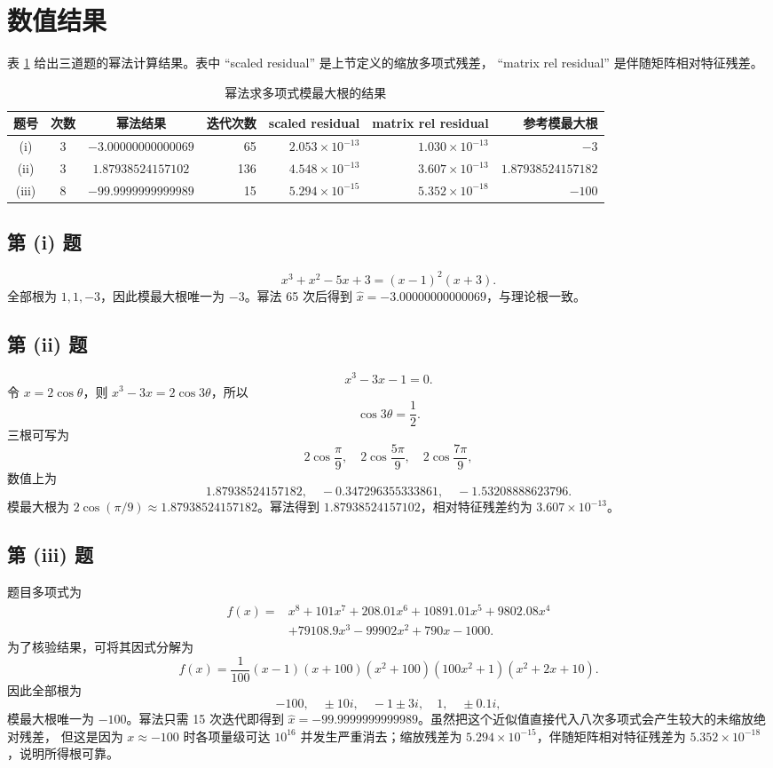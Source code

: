 \documentclass[a4paper,11pt]{article}
\begin{document}
\section{数值结果}
表 \ref{tab:results} 给出三道题的幂法计算结果。表中 ``scaled residual'' 是上节定义的缩放多项式残差，
``matrix rel residual'' 是伴随矩阵相对特征残差。

\begin{table}[H]
\centering
\scriptsize
\caption{幂法求多项式模最大根的结果}
\label{tab:results}
\setlength{\tabcolsep}{3pt}
\begin{tabular}{cccrrrr}
\toprule
题号 & 次数 & 幂法结果 & 迭代次数 & scaled residual & matrix rel residual & 参考模最大根 \\
\midrule
(i) & 3 & $-3.00000000000069$ & 65  & $2.053\times10^{-13}$ & $1.030\times10^{-13}$ & $-3$ \\
(ii) & 3 & $1.87938524157102$ & 136 & $4.548\times10^{-13}$ & $3.607\times10^{-13}$ & $1.87938524157182$ \\
(iii) & 8 & $-99.9999999999989$ & 15 & $5.294\times10^{-15}$ & $5.352\times10^{-18}$ & $-100$ \\
\bottomrule
\end{tabular}
\end{table}

\subsection{第 (i) 题}
\[
    x^3+x^2-5x+3=(x-1)^2(x+3).
\]
全部根为 $1,1,-3$，因此模最大根唯一为 $-3$。幂法 65 次后得到
$\hat x=-3.00000000000069$，与理论根一致。

\subsection{第 (ii) 题}
\[
    x^3-3x-1=0.
\]
令 $x=2\cos\theta$，则 $x^3-3x=2\cos3\theta$，所以
\[
    \cos3\theta=\frac12.
\]
三根可写为
\[
    2\cos\frac{\pi}{9},\quad
    2\cos\frac{5\pi}{9},\quad
    2\cos\frac{7\pi}{9},
\]
数值上为
\[
    1.87938524157182,\quad -0.347296355333861,\quad -1.53208888623796.
\]
模最大根为 $2\cos(\pi/9)\approx1.87938524157182$。幂法得到
$1.87938524157102$，相对特征残差约为 $3.607\times10^{-13}$。

\subsection{第 (iii) 题}
题目多项式为
\[
\begin{aligned}
f(x)=&x^8+101x^7+208.01x^6+10891.01x^5+9802.08x^4\\
&+79108.9x^3-99902x^2+790x-1000 .
\end{aligned}
\]
为了核验结果，可将其因式分解为
\[
    f(x)=\frac{1}{100}(x-1)(x+100)(x^2+100)(100x^2+1)(x^2+2x+10).
\]
因此全部根为
\[
    -100,\quad \pm10i,\quad -1\pm3i,\quad 1,\quad \pm0.1i,
\]
模最大根唯一为 $-100$。幂法只需 15 次迭代即得到
$\hat x=-99.9999999999989$。虽然把这个近似值直接代入八次多项式会产生较大的未缩放绝对残差，
但这是因为 $x\approx -100$ 时各项量级可达 $10^{16}$ 并发生严重消去；缩放残差为
$5.294\times10^{-15}$，伴随矩阵相对特征残差为 $5.352\times10^{-18}$，说明所得根可靠。
\end{document}
